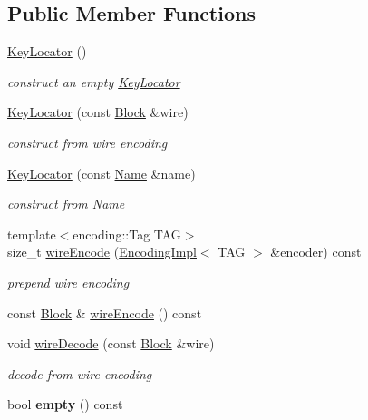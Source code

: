 \subsection*{Public Member Functions}
\begin{DoxyCompactItemize}
\item 
\hyperlink{classndn_1_1KeyLocator_a60b5e38717998c0f761edc935c1dc8f3}{Key\+Locator} ()\hypertarget{classndn_1_1KeyLocator_a60b5e38717998c0f761edc935c1dc8f3}{}\label{classndn_1_1KeyLocator_a60b5e38717998c0f761edc935c1dc8f3}

\begin{DoxyCompactList}\small\item\em construct an empty \hyperlink{classndn_1_1KeyLocator}{Key\+Locator} \end{DoxyCompactList}\item 
\hyperlink{classndn_1_1KeyLocator_a7549472652d52bdbc3c1b77bcc79f084}{Key\+Locator} (const \hyperlink{classndn_1_1Block}{Block} \&wire)\hypertarget{classndn_1_1KeyLocator_a7549472652d52bdbc3c1b77bcc79f084}{}\label{classndn_1_1KeyLocator_a7549472652d52bdbc3c1b77bcc79f084}

\begin{DoxyCompactList}\small\item\em construct from wire encoding \end{DoxyCompactList}\item 
\hyperlink{classndn_1_1KeyLocator_ac139151007b9706707ce3cade92825ca}{Key\+Locator} (const \hyperlink{classndn_1_1Name}{Name} \&name)
\begin{DoxyCompactList}\small\item\em construct from \hyperlink{classndn_1_1Name}{Name} \end{DoxyCompactList}\item 
{\footnotesize template$<$encoding\+::\+Tag T\+AG$>$ }\\size\+\_\+t \hyperlink{classndn_1_1KeyLocator_ada3677e2784d731bd6fae7769a1d2039}{wire\+Encode} (\hyperlink{classndn_1_1encoding_1_1EncodingImpl}{Encoding\+Impl}$<$ T\+AG $>$ \&encoder) const
\begin{DoxyCompactList}\small\item\em prepend wire encoding \end{DoxyCompactList}\item 
const \hyperlink{classndn_1_1Block}{Block} \& \hyperlink{classndn_1_1KeyLocator_a6d7327d49d99dcd6a4f5f1c8fb579e8b}{wire\+Encode} () const
\item 
void \hyperlink{classndn_1_1KeyLocator_a9c52c1f1e358ab736003e5aea689f60d}{wire\+Decode} (const \hyperlink{classndn_1_1Block}{Block} \&wire)
\begin{DoxyCompactList}\small\item\em decode from wire encoding \end{DoxyCompactList}\item 
bool {\bfseries empty} () const\hypertarget{classndn_1_1KeyLocator_af52101e4f02a829991222a6ee92b0462}{}\label{classndn_1_1KeyLocator_af52101e4f02a829991222a6ee92b0462}


\end{DoxyCompactItemize}
